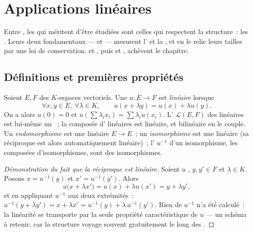 \chapter{Applications linéaires}\label{ch:b1:linmaps}

Entre , les  qui méritent d'être
étudiées sont celles qui respectent la structure~: les
\emph{}. Leurs deux  fondamentaux
---  et  --- mesurent l' et la , et
en  le  relie leurs tailles par une
loi de conservation.  et , puis 
et , achèvent le chapitre.

\section{Définitions et premières propriétés}

\begin{definition}\label{def:b1:linmaps:def}
Soient $E, F$ des $K$-espaces vectoriels. Une  $u \colon E
\to F$ est \emph{linéaire} lorsque
\[
\forall x, y \in E,\ \forall \lambda \in K, \qquad
u(x + \lambda y) = u(x) + \lambda u(y).
\]
On a alors $u(0) = 0$ et $u(\sum \lambda_i x_i) = \sum \lambda_i u(x_i)$.
L' $\mathcal{L}(E, F)$ des  linéaires est lui-même
un ~; la composée d' linéaires est
linéaire, et bilinéaire en le couple. Un \emph{endomorphisme} est une
 linéaire $E \to E$~; un \emph{isomorphisme} est une
 linéaire  (sa réciproque est alors automatiquement
linéaire)~; l' $u^{-1}$ d'un isomorphisme, les composées
d'isomorphismes, sont des isomorphismes.
\end{definition}

\begin{proof}[Démonstration du fait que la réciproque est linéaire]
Soient $u$  , $y, y' \in F$ et $\lambda \in K$.
Posons $x = u^{-1}(y)$ et $x' = u^{-1}(y')$. Alors
\[
u\bigl(x + \lambda x'\bigr) = u(x) + \lambda u(x')
= y + \lambda y' ,
\]
et en appliquant $u^{-1}$ aux deux extrémités~: $u^{-1}(y + \lambda y') = x
+ \lambda x' = u^{-1}(y) + \lambda\,u^{-1}(y')$. Rien de
$u^{-1}$ n'a été calculé~: la linéarité se transporte par la seule
propriété caractéristique de $u$ --- un schéma à retenir,
car la structure voyage souvent gratuitement le long des
.
\end{proof}

